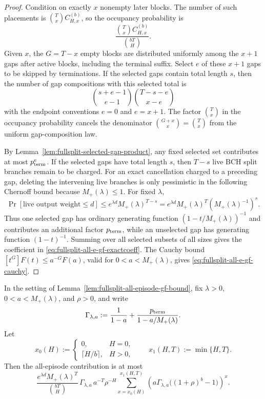 \begin{proof}
Condition on exactly \(x\) nonempty later blocks.  The number of such placements is
\(\binom{T}{x}C_{H,x}^{(b)}\), so the occupancy probability is
\[
\frac{\binom{T}{x}C_{H,x}^{(b)}}{\binom{bT}{H}}.
\]
Given \(x\), the \(G=T-x\) empty blocks are distributed uniformly among the \(x+1\) gaps after active blocks, including
the terminal suffix.  Select \(e\) of these \(x+1\) gaps to be skipped by terminations.  If the selected gaps contain
total length \(s\), then the number of gap compositions with this selected total is
\[
\binom{s+e-1}{e-1}\binom{T-s-e}{x-e}
\]
with the endpoint conventions \(e=0\) and \(e=x+1\).  The factor
\(\binom{T}{x}\) in the occupancy probability cancels the denominator
\(\binom{G+x}{x}=\binom{T}{x}\) from the uniform gap-composition law.

By Lemma~\ref{lem:fullsplit-selected-gap-product}, any fixed selected set contributes at most \(p_{\rm term}^e\).  If
the selected gaps have total length \(s\), then \(T-s\) live BCH split branches remain to be charged.  For an exact
cancellation charged to a preceding gap, deleting the intervening live branches is only pessimistic in the following
Chernoff bound because \(M_+(\lambda)\le1\).  For fixed \(\lambda\),
\[
\Pr[\text{live output weight}\le d]
\le e^{\lambda d}M_+(\lambda)^{T-s}
=e^{\lambda d}M_+(\lambda)^T\left(M_+(\lambda)^{-1}\right)^s.
\]
Thus one selected gap has ordinary generating function
\((1-t/M_+(\lambda))^{-1}\) and contributes an additional factor \(p_{\rm term}\), while an unselected gap has
generating function \((1-t)^{-1}\).  Summing over all selected subsets of all sizes gives the coefficient in
\eqref{eq:fullsplit-all-e-gf-exactcoeff}.  The Cauchy bound
\([t^G]F(t)\le a^{-G}F(a)\), valid for \(0<a<M_+(\lambda)\), gives
\eqref{eq:fullsplit-all-e-gf-cauchy}.
\end{proof}

\begin{corollary}
\label{cor:fullsplit-all-episode-coeff-free}
In the setting of Lemma~\ref{lem:fullsplit-all-episode-gf-bound}, fix \(\lambda>0\), \(0<a<M_+(\lambda)\), and
\(\rho>0\), and write
\[
\Gamma_{\lambda,a}:=
\frac{1}{1-a}
+
\frac{p_{\rm term}}{1-a/M_+(\lambda)}.
\]
Let
\[
x_0(H):=
\begin{cases}
0,&H=0,\\
\lceil H/b\rceil,&H>0,
\end{cases}
\qquad
x_1(H,T):=\min\{H,T\}.
\]
Then the all-episode contribution is at most
\begin{equation}
\label{eq:fullsplit-all-e-coeff-free}
\frac{e^{\lambda d}M_+(\lambda)^T}{\binom{bT}{H}}\,
\Gamma_{\lambda,a}\,a^{-T}\rho^{-H}
\sum_{x=x_0(H)}^{x_1(H,T)}
\left(a\Gamma_{\lambda,a}\big((1+\rho)^b-1\big)\right)^x .
\end{equation}
\end{corollary}

